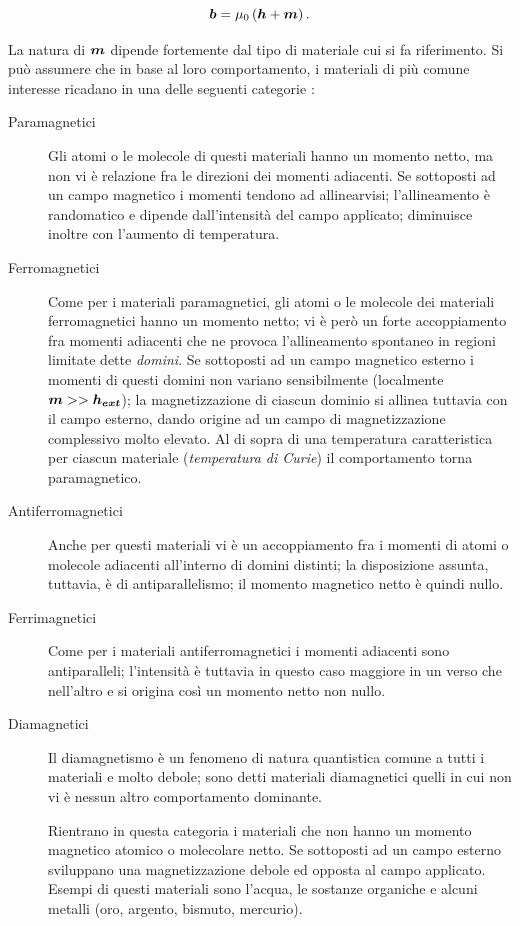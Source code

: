 \begin{equation}
\label{eq:2current4}
\boldsymbol{b}=\mu_0\left(\boldsymbol{h}+\boldsymbol{m}\right).
\end{equation}

La natura di $\boldsymbol{m}$ dipende fortemente dal tipo di materiale cui si fa riferimento. Si può assumere che in base al loro comportamento, i materiali di più comune interesse ricadano in una delle seguenti categorie \citep{furlani_permanent_2001}:
\begin{description}
\item[Paramagnetici]Gli atomi o le molecole di questi materiali hanno un momento netto, ma non vi è relazione fra le direzioni dei momenti adiacenti. Se sottoposti ad un campo magnetico i momenti tendono ad allinearvisi; l'allineamento è randomatico e dipende dall'intensità del campo applicato; diminuisce inoltre con l'aumento di temperatura.
\item[Ferromagnetici] Come per i materiali paramagnetici, gli atomi o le molecole dei materiali ferromagnetici hanno un momento netto; vi è però un forte accoppiamento fra momenti adiacenti che ne provoca l'allineamento spontaneo in regioni limitate dette \textit{domini}. Se sottoposti ad un campo magnetico esterno i momenti di questi domini non variano sensibilmente (localmente $\boldsymbol{m}>>\boldsymbol{h_{ext}}$); la magnetizzazione di ciascun dominio si allinea tuttavia con il campo esterno, dando origine ad un campo di magnetizzazione complessivo molto elevato. Al di sopra di una temperatura caratteristica per ciascun materiale (\textit{temperatura di Curie}) il comportamento torna paramagnetico.
\item[Antiferromagnetici] Anche per questi materiali vi è un accoppiamento fra i momenti di atomi o molecole adiacenti all'interno di domini distinti; la disposizione assunta, tuttavia, è di antiparallelismo; il momento magnetico netto è quindi nullo.
\item[Ferrimagnetici]Come per i materiali antiferromagnetici i momenti adiacenti sono antiparalleli; l'intensità è tuttavia in questo caso maggiore in un verso che nell'altro e si origina così un momento netto non nullo.
\item[Diamagnetici] Il diamagnetismo è un fenomeno di natura quantistica comune a tutti i materiali e molto debole; sono detti materiali diamagnetici quelli in cui non vi è nessun altro comportamento dominante.

Rientrano in questa categoria i materiali che non hanno un momento magnetico atomico o molecolare netto. Se sottoposti ad un campo esterno sviluppano una magnetizzazione debole ed opposta al campo applicato. Esempi di questi materiali sono l'acqua, le sostanze organiche e alcuni metalli (oro, argento, bismuto, mercurio).
\end{description}

